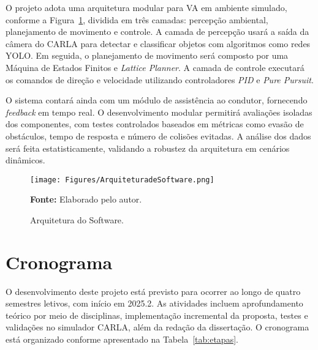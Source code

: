\documentclass[
	12pt,				%
	oneside, %
	a4paper,			%
	english,			%
	french,				%
	spanish,			%
	brazil				%
	]{abntex2}
\begin{document}
O projeto adota uma arquitetura modular para VA em ambiente simulado, conforme a Figura~\ref{fig:arquiteturaa}, dividida em três camadas: percepção ambiental, planejamento de movimento e controle.
A camada de percepção usará a saída da câmera do CARLA para detectar e classificar objetos com algoritmos como redes YOLO. Em seguida, o planejamento de movimento será composto por uma Máquina de Estados Finitos e \textit{Lattice Planner}. A camada de controle executará os comandos de direção e velocidade utilizando controladores \textit{PID} e \textit{Pure Pursuit}.

O sistema contará ainda com um módulo de assistência ao condutor, fornecendo \textit{feedback} em tempo real. O desenvolvimento modular permitirá avaliações isoladas dos componentes, com testes controlados baseados em métricas como evasão de obstáculos, tempo de resposta e número de colisões evitadas. A análise dos dados será feita estatisticamente, validando a robustez da arquitetura em cenários dinâmicos.

\begin{figure}[H]
    \centering
    \texttt{[image: Figures/ArquiteturadeSoftware.png]}
    \caption{Arquitetura do Software.}
    \label{fig:arquiteturaa}
    \small\textbf{Fonte:} Elaborado pelo autor.
\end{figure}



\section{Cronograma}

O desenvolvimento deste projeto está previsto para ocorrer ao longo de quatro semestres letivos, com início em 2025.2. As atividades incluem aprofundamento teórico por meio de disciplinas, implementação incremental da proposta, testes e validações no simulador CARLA, além da redação da dissertação. O cronograma está organizado conforme apresentado na Tabela~\ref{tab:etapas}.
\end{document}
